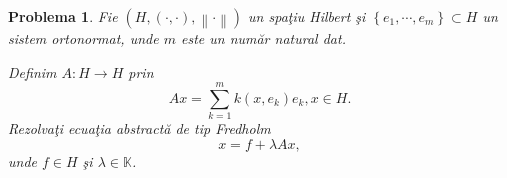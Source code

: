 \documentclass[a4paper,12pt,oneside]{report}
\newtheorem{problem}{Problema}
\begin{document}
  	      			      			      			      	
\begin{problem}
Fie \(\left ( H, \left ( \cdot ,\cdot  \right ), \left \| \cdot  \right \| \right )\) un spa\c{t}iu Hilbert \c{s}i  \(\left \{ e_{1},\cdots, e_{m} \right \} \subset H\) un sistem ortonormat, unde \(m\) este un num\u{a}r natural dat.

\noindent Definim \(A : H \rightarrow H\) prin
\begin{displaymath}
  Ax = \sum_{k = 1 }^{m} k\left ( x,e_{k} \right )e_{k}, x \in H.
\end{displaymath}
Rezolva\c{t}i ecua\c{t}ia abstract\u{a} de tip Fredholm
\begin{displaymath}
  x = f + \lambda Ax,
\end{displaymath}
unde \(f\in H\) \c{s}i \(\lambda \in \mathbb{K}\).
\end{problem}
  	      			      	
\end{document}
